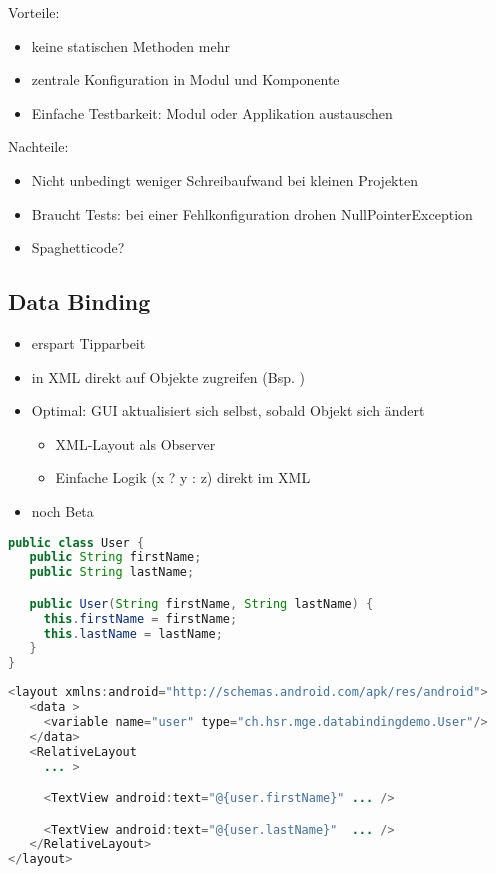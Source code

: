Vorteile:
\begin{itemize}
\item keine statischen Methoden mehr
\item zentrale Konfiguration in Modul und Komponente
\item Einfache Testbarkeit: Modul oder Applikation austauschen
\end{itemize}
Nachteile:
\begin{itemize}
\item Nicht unbedingt weniger Schreibaufwand bei kleinen Projekten
\item Braucht Tests: bei einer Fehlkonfiguration drohen NullPointerException
\item Spaghetticode?
\end{itemize}
\subsection{Data Binding}
\begin{itemize}
\item erspart Tipparbeit
\item in XML direkt auf Objekte zugreifen (Bsp. )
\item Optimal: GUI aktualisiert sich selbst, sobald Objekt sich ändert
\begin{itemize}
\item XML-Layout als Observer
\item Einfache Logik (x ? y : z) direkt im XML
\end{itemize}
\item noch Beta
\end{itemize}
\begin{lstlisting}[language=java]
public class User {
   public String firstName;
   public String lastName;

   public User(String firstName, String lastName) {
     this.firstName = firstName;
     this.lastName = lastName;
   }
}
\end{lstlisting}
\begin{lstlisting}[language=java]
<layout xmlns:android="http://schemas.android.com/apk/res/android">
   <data >
     <variable name="user" type="ch.hsr.mge.databindingdemo.User"/>
   </data>
   <RelativeLayout
     ... >

     <TextView android:text="@{user.firstName}" ... />

     <TextView android:text="@{user.lastName}"  ... />
   </RelativeLayout>
</layout>
\end{lstlisting}
